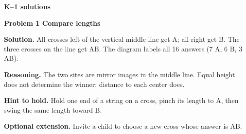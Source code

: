 \documentclass[letterpaper,11pt]{article}
\begin{document}
\newpage
{\Large\bfseries K--1 solutions}\par
\vspace{.08in}
{\large\bfseries Problem 1 Compare lengths}\par
\vspace{3pt}
\noindent\begin{minipage}[t]{.58\textwidth}\vspace{0pt}
\fontsize{10.8}{13.2}\selectfont
\textbf{Solution.} All crosses left of the vertical middle line get A; all right get B. The three crosses on the line get AB. The diagram labels all 16 answers (7 A, 6 B, 3 AB).

\textbf{Reasoning.} The two sites are mirror images in the middle line. Equal height does not determine the winner; distance to each center does.

\textbf{Hint to hold.} Hold one end of a string on a cross, pinch its length to A, then swing the same length toward B.

\textbf{Optional extension.} Invite a child to choose a new cross whose answer is AB.
\end{minipage}\hfill\begin{minipage}[t]{.40\textwidth}\vspace{0pt}\centering
{}
\end{minipage}
\end{document}
